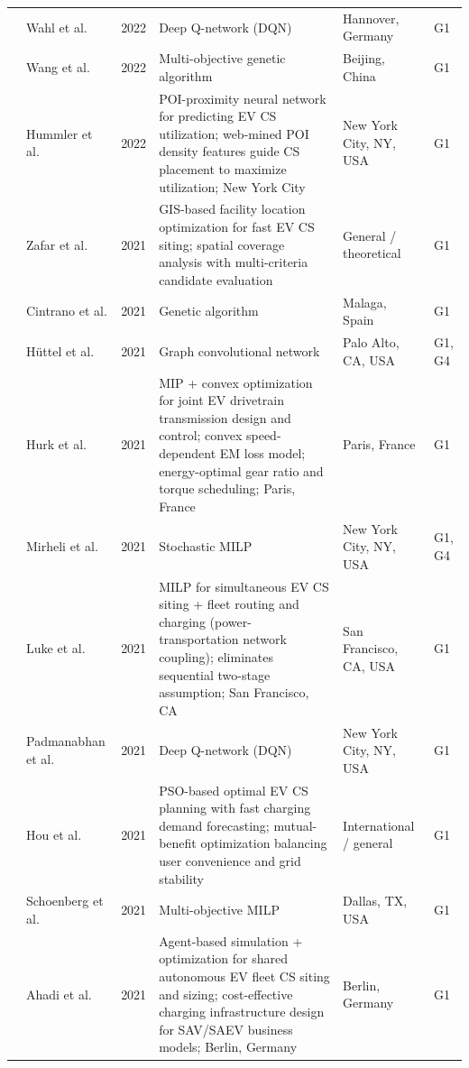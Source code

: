 \documentclass[letterpaper, 12pt, oneside, doublespacing]{Thesis}
\begin{document}
\begin{longtable}{L{0.9cm} L{2.2cm} L{0.8cm} L{3.3cm} L{2.5cm} L{1.5cm}}
\cite{reinforcement_learning-based_2022} & Wahl et al. & 2022 & Deep Q-network (DQN) & Hannover, Germany & G1 \\
\cite{research_on_2022} & Wang et al. & 2022 & Multi-objective genetic algorithm & Beijing, China & G1 \\
\cite{web_mining_2022} & Hummler et al. & 2022 & POI-proximity neural network for predicting EV CS utilization; web-mined POI density features guide CS placement to maximize utilization; New York City & New York City, NY, USA & G1 \\
\cite{a_gis-based_2021} & Zafar et al. & 2021 & GIS-based facility location optimization for fast EV CS siting; spatial coverage analysis with multi-criteria candidate evaluation & General {\slash} theoretical & G1 \\
\cite{citizen_centric_2021} & Cintrano et al. & 2021 & Genetic algorithm & Malaga, Spain & G1 \\
\cite{deep_spatio-temporal_2021} & H\"uttel et al. & 2021 & Graph convolutional network & Palo Alto, CA, USA & G1, G4 \\
\cite{energy-optimal_design_2021} & Hurk et al. & 2021 & MIP + convex optimization for joint EV drivetrain transmission design and control; convex speed-dependent EM loss model; energy-optimal gear ratio and torque scheduling; Paris, France & Paris, France & G1 \\
\cite{hierarchical_optimization_2021} & Mirheli et al. & 2021 & Stochastic MILP & New York City, NY, USA & G1, G4 \\
\cite{joint_optimization_2021} & Luke et al. & 2021 & MILP for simultaneous EV CS siting + fleet routing and charging (power-transportation network coupling); eliminates sequential two-stage assumption; San Francisco, CA & San Francisco, CA, USA & G1 \\
\cite{optimal_placement_2021} & Padmanabhan et al. & 2021 & Deep Q-network (DQN) & New York City, NY, USA & G1 \\
\cite{optimal_planning_2021} & Hou et al. & 2021 & PSO-based optimal EV CS planning with fast charging demand forecasting; mutual-benefit optimization balancing user convenience and grid stability & International {\slash} general & G1 \\
\cite{reducing_waiting_2021} & Schoenberg et al. & 2021 & Multi-objective MILP & Dallas, TX, USA & G1 \\
\cite{siting_and_2021} & Ahadi et al. & 2021 & Agent-based simulation + optimization for shared autonomous EV fleet CS siting and sizing; cost-effective charging infrastructure design for SAV/SAEV business models; Berlin, Germany & Berlin, Germany & G1 \\

\end{longtable}
\end{document}
